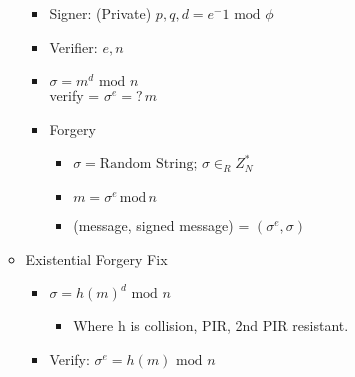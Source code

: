 \begin{itemize}
\begin{itemize}
\begin{itemize}
        \item Signer: (Private) $p, q, d = e^-1 \text{ mod } \phi$
        \item Verifier: $e,n$
        \item $\sigma = m^d \text{ mod } n$
        \\verify = $\sigma^e =?\,m$
        \item Forgery
            \begin{itemize}
            \item $\sigma = \text{Random String}$; $\sigma \in_R Z_N^*$
            \item $m = \sigma^e\,\text{mod}\,n$
            \item (message, signed message) = $(\sigma^e, \sigma)$
            \end{itemize}
        \end{itemize}
    \item Existential Forgery Fix
        \begin{itemize}
        \item $\sigma = h(m)^d \text{ mod } n$
            \begin{itemize}
            \item Where h is collision, PIR, 2nd PIR resistant. 
            \end{itemize}
        \item Verify: $\sigma^e = h(m) \text{ mod } n$
        \end{itemize}
    \end{itemize}
\end{itemize}